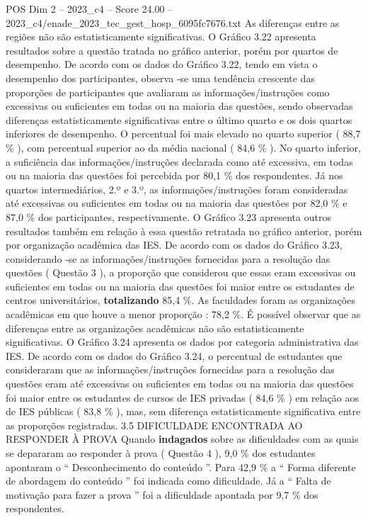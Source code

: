 \begin{textsample}{POS Dim 2 – 2023\_c4 – Score 24.00 – 2023\_c4/enade\_2023\_tec\_gest\_hosp\_6095fc7676.txt}
As diferenças entre as regiões não são estatisticamente significativas.
O Gráfico 3.22 apresenta resultados sobre a questão tratada no gráfico anterior, porém por quartos de desempenho.
De acordo com os dados do Gráfico 3.22, tendo em vista o desempenho dos participantes, observa -se uma tendência crescente das proporções de participantes que avaliaram as informações/instruções como excessivas ou suficientes em todas ou na maioria das questões, sendo observadas diferenças estatisticamente significativas entre o último quarto e os dois quartos inferiores de desempenho.
O percentual foi mais elevado no quarto superior ( 88,7 \% ), com percentual superior ao da média nacional ( 84,6 \% ).
No quarto inferior, a suficiência das informações/instruções declarada como até excessiva, em todas ou na maioria das questões foi percebida por 80,1 \% dos respondentes.
Já nos quartos intermediários, 2.º e 3.º, as informações/instruções foram consideradas até excessivas ou suficientes em todas ou na maioria das questões por 82,0 \% e 87,0 \% dos participantes, respectivamente.
O Gráfico 3.23 apresenta outros resultados também em relação à essa questão retratada no gráfico anterior, porém por organização acadêmica das IES.
De acordo com os dados do Gráfico 3.23, considerando -se as informações/instruções fornecidas para a resolução das questões ( Questão 3 ), a proporção que considerou que essas eram excessivas ou suficientes em todas ou na maioria das questões foi maior entre os estudantes de centros universitários, \textbf{totalizando} 85,4 \%.
As faculdades foram as organizações acadêmicas em que houve a menor proporção : 78,2 \%.
É possível observar que as diferenças entre as organizações acadêmicas não são estatisticamente significativas.
O Gráfico 3.24 apresenta os dados por categoria administrativa das IES.
De acordo com os dados do Gráfico 3.24, o percentual de estudantes que consideraram que as informações/instruções fornecidas para a resolução das questões eram até excessivas ou suficientes em todas ou na maioria das questões foi maior entre os estudantes de cursos de IES privadas ( 84,6 \% ) em relação aos de IES públicas ( 83,8 \% ), mas, sem diferença estatisticamente significativa entre as proporções registradas. 3.5 DIFICULDADE ENCONTRADA AO RESPONDER À PROVA Quando \textbf{indagados} sobre as dificuldades com as quais se depararam ao responder à prova ( Questão 4 ), 9,0 \% dos estudantes apontaram o “ Desconhecimento do conteúdo ”.
Para 42,9 \% a “ Forma diferente de abordagem do conteúdo ” foi indicada como dificuldade.
Já a “ Falta de motivação para fazer a prova ” foi a dificuldade apontada por 9,7 \% dos respondentes.

\end{textsample}
